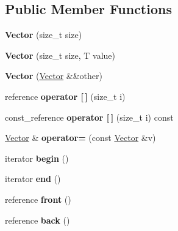 \subsection*{Public Member Functions}
\begin{DoxyCompactItemize}
\item 
\mbox{\label{class_vector_a0a182fd3a89769a7ba22d560ae6e8439}} 
{\bfseries Vector} (size\+\_\+t size)
\item 
\mbox{\label{class_vector_a67cc36c29e716e5f803ad92b3d2d3fae}} 
{\bfseries Vector} (size\+\_\+t size, T value)
\item 
\mbox{\label{class_vector_a9b1e4af5aa7fd119539f02c810d20540}} 
{\bfseries Vector} (\mbox{\hyperlink{class_vector}{Vector}} \&\&other)
\item 
\mbox{\label{class_vector_af91f8108ebdb9f6985cafb04cdc17fa4}} 
reference {\bfseries operator \mbox{[}$\,$\mbox{]}} (size\+\_\+t i)
\item 
\mbox{\label{class_vector_ab71ae011c3eb0ae99e6d8a366e6a637f}} 
const\+\_\+reference {\bfseries operator \mbox{[}$\,$\mbox{]}} (size\+\_\+t i) const
\item 
\mbox{\label{class_vector_a74cfd8a6b7228ed4b084cf80c21b6acf}} 
\mbox{\hyperlink{class_vector}{Vector}} \& {\bfseries operator=} (const \mbox{\hyperlink{class_vector}{Vector}} \&v)
\item 
\mbox{\label{class_vector_a466e8c045ea10d62c28b689888e9fe5a}} 
iterator {\bfseries begin} ()
\item 
\mbox{\label{class_vector_ae288fa619188bff101d5300b8aaf9a90}} 
iterator {\bfseries end} ()
\item 
\mbox{\label{class_vector_a2f2e14b2a9a0041c783b5ad44dd59593}} 
reference {\bfseries front} ()
\item 
\mbox{\label{class_vector_a8abc3f8273089dadf91fb8eaca0676e6}} 
reference {\bfseries back} ()
\item 
\mbox{\label{class_vector_a9b439586cd10cb45d002ca9d6e3db43c}} 

\end{DoxyCompactItemize}
